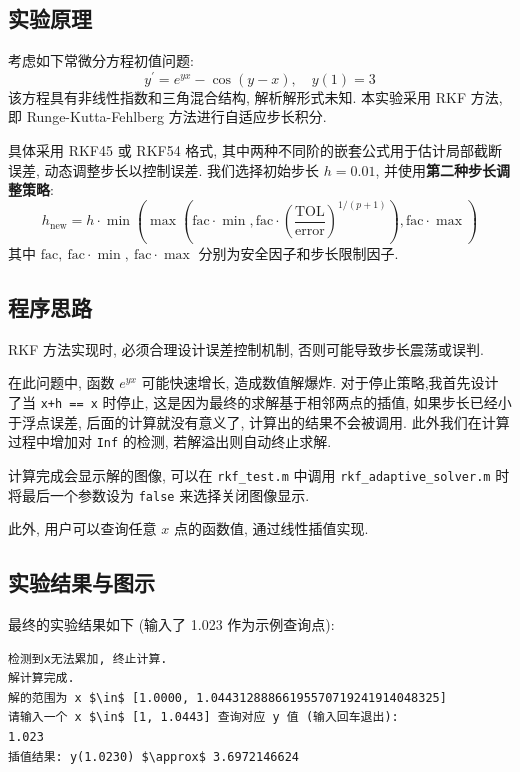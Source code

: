 \documentclass[12pt]{article}
\begin{document}
		\subsection{实验原理}
			考虑如下常微分方程初值问题:
			\begin{equation}
				y^{\prime} = e^{yx} - \cos\left(y - x\right), \quad y\left(1\right) = 3
			\end{equation}
			该方程具有非线性指数和三角混合结构, 解析解形式未知. 本实验采用 RKF 方法, 即 Runge-Kutta-Fehlberg 方法进行自适应步长积分.

			具体采用 RKF45 或 RKF54 格式, 其中两种不同阶的嵌套公式用于估计局部截断误差, 动态调整步长以控制误差. 我们选择初始步长 $h = 0.01$, 并使用\textbf{第二种步长调整策略}:
			\begin{equation}
				h_{\text{new}} = h \cdot \min\left(\max\left(\text{fac} \cdot {\min}, \text{fac} \cdot \left(\frac{\text{TOL}}{\text{error}}\right)^{1/(p+1)}\right), \text{fac} \cdot {\max}\right)
			\end{equation}
			其中 $\text{fac},\ \text{fac}\cdot{\min},\ \text{fac}\cdot{\max}$ 分别为安全因子和步长限制因子.

		\subsection{程序思路}
			RKF 方法实现时, 必须合理设计误差控制机制, 否则可能导致步长震荡或误判.
			
			在此问题中, 函数 $e^{yx}$ 可能快速增长, 造成数值解爆炸. 对于停止策略,我首先设计了当 \texttt{x+h == x} 时停止, 这是因为最终的求解基于相邻两点的插值, 如果步长已经小于浮点误差, 后面的计算就没有意义了, 计算出的结果不会被调用. 此外我们在计算过程中增加对 \texttt{Inf} 的检测, 若解溢出则自动终止求解.
			
			计算完成会显示解的图像, 可以在 \texttt{rkf\_test.m} 中调用 \texttt{rkf\_adaptive\_solver.m} 时将最后一个参数设为 \texttt{false} 来选择关闭图像显示.

			此外, 用户可以查询任意 $x$ 点的函数值, 通过线性插值实现.

		\subsection{实验结果与图示}
			最终的实验结果如下 (输入了 1.023 作为示例查询点):

			\begin{lstlisting}[mathescape=true]
检测到x无法累加, 终止计算.
解计算完成.
解的范围为 x $\in$ [1.0000, 1.04431288866195570719241914048325]
请输入一个 x $\in$ [1, 1.0443] 查询对应 y 值 (输入回车退出):
1.023
插值结果: y(1.0230) $\approx$ 3.6972146624
			\end{lstlisting}
\end{document}
